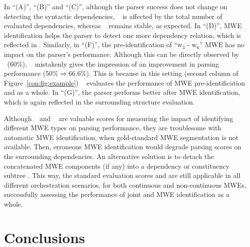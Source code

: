 \documentclass[output=paper]{langsci/langscibook}
\begin{document}
In ``(A)'', ``(B)'' and ``(C)'', although the parser success does not change on detecting the syntactic dependencies, \asuo~ is affected by the total number of evaluated dependencies, whereas \asus~ remains stable, as expected.
In ``(D)'', MWE identification helps the parser to detect one more dependency relation, which is reflected in \asus{}.
Similarly, in ``(F)'', the pre-identification of  ``w$_3$ - w$_6$'' MWE has no impact on the parser's performance.
Although this can be directly observed by \asus~(60\%), \asuo~ mistakenly gives the impression of an improvement in parsing performance (50\%$\Rightarrow$66.6\%). This is because  in this setting (second column of Figure~\ref{con:fig:example})
\asuo~ evaluates the performance of MWE pre-identification and  as a whole.
In ``(G)'', the parser performs better after MWE identification, which is again reflected in the surrounding structure evaluation.

Although \asus~ and \asls~ are valuable scores for measuring the impact of identifying different MWE types on parsing performance, they are troublesome with automatic MWE identification, when gold-standard MWE segmentation is not available. Then, erroneous MWE identification would degrade parsing scores on the surrounding dependencies.
An alternative solution is to detach the concatenated MWE components (if any) into a dependency or constituency subtree \citep{candito2014strategies,eryigit:2011:multiword}. This way, the standard evaluation scores \asu{} and \asl{} are still applicable in all different orchestration scenarios, for both continuous and non-continuous MWEs, successfully assessing the performance of joint  and MWE identification as a whole.

%
\section{Conclusions}
\label{con:sec:conclusions}
\end{document}
